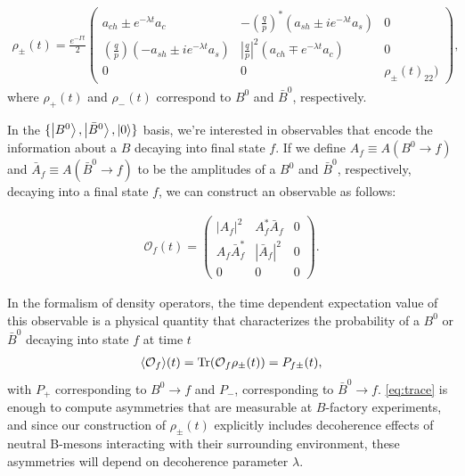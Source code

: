 \begin{align}
\label{eq:density}
\rho_{\pm}(t) = \frac{e^{-\Gamma t}}{2}\begin{pmatrix}
a_{ch} \pm e^{-\lambda t}a_c & -\left(\frac{q}{p}\right)^*\left(a_{sh}\pm ie^{-\lambda t}a_s\right) & 0 \\
\left(\frac{q}{p}\right)\left(-a_{sh} \pm ie^{-\lambda t}a_s \right) & \left|\frac{q}{p}\right|^2 \left(a_{ch}\mp e^{-\lambda t}a_c\right)  & 0 \\
0 & 0 & \rho_{\pm}(t)_{22})
\end{pmatrix},
\end{align}
where $\rho_+(t)$ and $\rho_-(t)$ correspond to $B^0$ and $\bar{B}^0$, respectively.

In the $\{\ket{B^0},\ket{\bar{B}^0},\ket{0}\}$ basis, we're interested in observables that encode the information about a $B$ decaying into final state $f$. If we define $A_f \equiv A(B^0\rightarrow f)$ and $\bar{A}_f \equiv A(\bar{B}^0\rightarrow f)$ to be the amplitudes of a $B^0$ and $\bar{B}^0$, respectively, decaying into a final state $f$, we can construct an observable as follows:

\begin{align}
\label{eq:observable}
\mathcal{O}_f(t) = 
\begin{pmatrix}
|A_f|^2 & A_f^*\bar{A}_f & 0 \\
A_f\bar{A}_f^* & |\bar{A}_f|^2 & 0 \\
0 & 0 & 0
\end{pmatrix}.
\end{align}

In the formalism of density operators, the time dependent expectation value of this observable is a physical quantity that characterizes the probability of a $B^0$ or $\bar{B}^0$ decaying into state $f$ at time $t$
\begin{align}
\label{eq:trace}
\langle\mathcal{O}_f\rangle(t) = \Tr(\mathcal{O}_f \rho_\pm(t)) = P_{f\pm}(t),
\end{align}
with $P_+$ corresponding to $B^0\rightarrow f$ and $P_-$, corresponding to $\bar{B}^0\rightarrow f$. \ref{eq:trace} is enough to compute asymmetries that are measurable at $B$-factory experiments, and since our construction of $\rho_\pm(t)$ explicitly includes decoherence effects of neutral B-mesons interacting with their surrounding environment, these asymmetries will depend on decoherence parameter $\lambda$.

